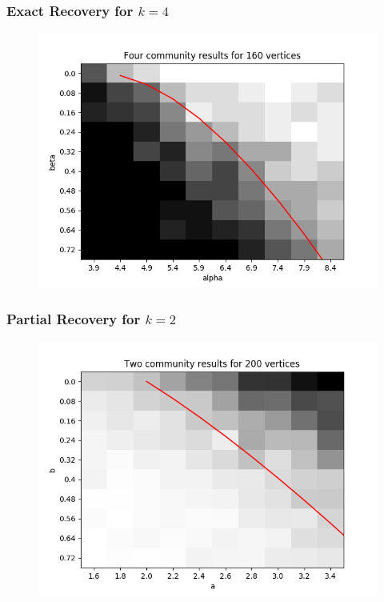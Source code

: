 \documentclass[10pt]{beamer}
\begin{document}
\begin{frame}
\frametitle{Exact Recovery for $k=4$}
\begin{figure}
  \centering
 \includegraphics[scale=.6]{../exact/final_plots/four_communities_160_verts.png}
\end{figure}

\end{frame}

\begin{frame}
\frametitle{Partial Recovery for $k=2$}
\begin{figure}
  \centering
 \includegraphics[scale=.6]{../inexact/final_plots/two_communities_200_verts.png}
\end{figure}

\end{frame}
\end{document}

